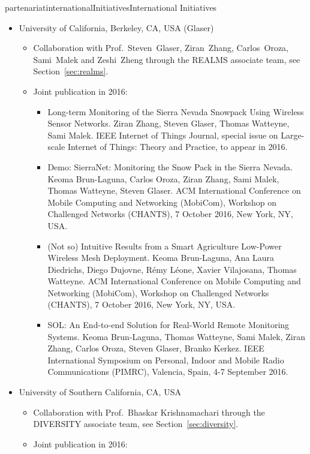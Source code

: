 \documentclass{ra2016}
\begin{document}
\begin{module}{partenariat}{internationalInitiatives}{International Initiatives}
\begin{itemize}
    \item University of California, Berkeley, CA, USA (Glaser)
        \begin{itemize}
            \item Collaboration with Prof.~Steven~Glaser, Ziran~Zhang, Carlos~Oroza, Sami~Malek and Zeshi~Zheng through the REALMS associate team, see Section~\ref{sec:realms}.
            \item Joint publication in 2016:
                \begin{itemize}
                    \item Long-term Monitoring of the Sierra Nevada Snowpack Using Wireless Sensor Networks. Ziran Zhang, Steven Glaser, Thomas Watteyne, Sami Malek. IEEE Internet of Things Journal, special issue on Large-scale Internet of Things: Theory and Practice, to appear in 2016.
                    \item Demo: SierraNet: Monitoring the Snow Pack in the Sierra Nevada. Keoma Brun-Laguna, Carlos Oroza, Ziran Zhang, Sami Malek, Thomas Watteyne, Steven Glaser.  ACM International Conference on Mobile Computing and Networking (MobiCom), Workshop on Challenged Networks (CHANTS), 7 October 2016, New York, NY, USA.
                    \item (Not so) Intuitive Results from a Smart Agriculture Low-Power Wireless Mesh Deployment. Keoma Brun-Laguna, Ana Laura Diedrichs, Diego Dujovne, Rémy Léone, Xavier Vilajosana, Thomas Watteyne. ACM International Conference on Mobile Computing and Networking (MobiCom), Workshop on Challenged Networks (CHANTS), 7 October 2016, New York, NY, USA.
                    \item SOL: An End-to-end Solution for Real-World Remote Monitoring Systems. Keoma Brun-Laguna, Thomas Watteyne, Sami Malek, Ziran Zhang, Carlos Oroza, Steven Glaser, Branko Kerkez. IEEE International Symposium on Personal, Indoor and Mobile Radio Communications (PIMRC), Valencia, Spain, 4-7 September 2016.
                \end{itemize}
        \end{itemize}
    \item University of Southern California, CA, USA
        \begin{itemize}
            \item Collaboration with Prof.~Bhaskar Krishnamachari through the DIVERSITY associate team, see Section~\ref{sec:diversity}.
            \item Joint publication in 2016:

\end{itemize}
\end{itemize}
\end{module}
\end{document}
